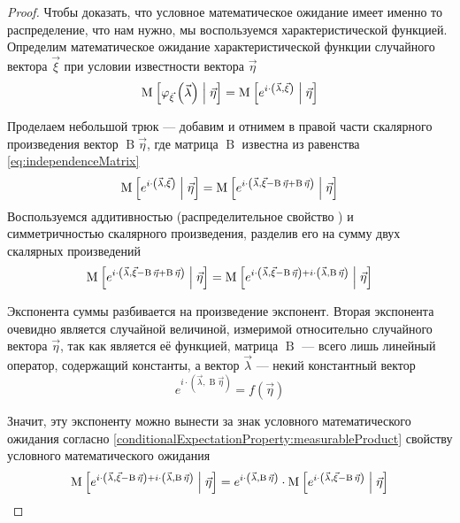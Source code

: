 \begin{proof}
    Чтобы доказать, что условное математическое ожидание имеет именно то
    распределение, что нам нужно, мы воспользуемся характеристической функцией.
    Определим математическое ожидание характеристической функции случайного
    вектора $\vec{\xi}$ при условии известности вектора $\vec{\eta}$
    $$\operatorname{M}_{} \left[ \varphi_{\vec{\xi}}\left( \vec{\lambda} \right) \;\middle|\; \vec{\eta} \right]
        = \operatorname{M}_{} \left[ e^{i \cdot \left( \vec{\lambda}, \vec{\xi} \right)}
            \;\middle|\; \vec{\eta} \right]$$

    Проделаем небольшой трюк --- добавим и отнимем в правой части скалярного
    произведения вектор $\operatorname{B} \vec{\eta}$, где матрица
    $\operatorname{B}$ известна из равенства \eqref{eq:independenceMatrix}
    $$\operatorname{M}_{} \left[ e^{i \cdot \left( \vec{\lambda}, \vec{\xi} \right)}
            \;\middle|\; \vec{\eta} \right]
        = \operatorname{M}_{} \left[ e^{i \cdot \left( \vec{\lambda},
                \vec{\xi} - \operatorname{B} \vec{\eta}
                    + \operatorname{B} \vec{\eta} \right)}
            \;\middle|\; \vec{\eta} \right]$$
    Воспользуемся аддитивностью (распределительное свойство
    \cite[с.~82]{VoevodinLA}) и симметричностью скалярного произведения,
    разделив его на сумму двух скалярных произведений
    $$\operatorname{M}_{} \left[ e^{i \cdot \left( \vec{\lambda},
            \vec{\xi} - \operatorname{B} \vec{\eta}
                + \operatorname{B} \vec{\eta} \right)}
            \;\middle|\; \vec{\eta} \right]
        = \operatorname{M}_{} \left[ e^{i \cdot \left( \vec{\lambda},
                \vec{\xi} - \operatorname{B} \vec{\eta} \right)
                    + i \cdot \left( \vec{\lambda},
                        \operatorname{B} \vec{\eta} \right)}
            \;\middle|\; \vec{\eta} \right]$$

    Экспонента суммы разбивается на произведение экспонент. Вторая экспонента
    очевидно является случайной величиной, измеримой относительно случайного
    вектора $\vec{\eta}$, так как является её функцией, матрица
    $\operatorname{B}$ --- всего лишь линейный оператор, содержащий константы,
    а вектор $\vec{\lambda}$ --- некий константный вектор
    $$e^{i \cdot \left( \vec{\lambda}, \operatorname{B} \vec{\eta} \right)}
        = f\left( \vec{\eta} \right)$$

    Значит, эту экспоненту можно вынести за знак условного математического
    ожидания согласно \ref{conditionalExpectationProperty:measurableProduct}
    свойству условного математического ожидания
    $$\operatorname{M}_{} \left[ e^{i \cdot \left( \vec{\lambda},
                \vec{\xi} - \operatorname{B} \vec{\eta} \right)
                    + i \cdot \left( \vec{\lambda},
                        \operatorname{B} \vec{\eta} \right)}
            \;\middle|\; \vec{\eta} \right]
        = e^{i \cdot \left( \vec{\lambda}, \operatorname{B} \vec{\eta} \right)}
                \cdot \operatorname{M}_{} \left[ e^{i \cdot \left( \vec{\lambda},
                    \vec{\xi} - \operatorname{B} \vec{\eta} \right)}
                \;\middle|\; \vec{\eta} \right]$$


\end{proof}
